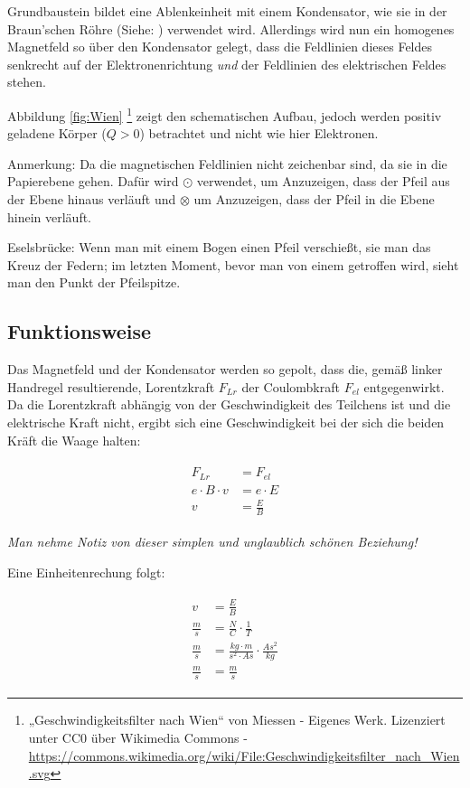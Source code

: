 Grundbaustein bildet eine Ablenkeinheit mit einem Kondensator, wie sie in der Braun'schen Röhre (Siehe: ) verwendet wird. Allerdings wird nun ein homogenes Magnetfeld so über den Kondensator gelegt, dass die Feldlinien dieses Feldes senkrecht auf der Elektronenrichtung \emph{und} der Feldlinien des elektrischen Feldes stehen.

Abbildung \ref{fig:Wien} \footnote{„Geschwindigkeitsfilter nach Wien“ von Miessen - Eigenes Werk. Lizenziert unter CC0 über Wikimedia Commons - \url{https://commons.wikimedia.org/wiki/File:Geschwindigkeitsfilter\_nach\_Wien.svg}} zeigt den schematischen Aufbau, jedoch werden positiv geladene Körper ($Q>0$) betrachtet und nicht wie hier Elektronen.


\begin{leftbar}
	Anmerkung: Da die magnetischen Feldlinien nicht zeichenbar sind, da sie \glqq in die Papierebene\grqq{} gehen. Dafür wird $\odot$ verwendet, um Anzuzeigen, dass der Pfeil aus der Ebene hinaus verläuft und $\otimes$ um Anzuzeigen, dass der Pfeil in die Ebene hinein verläuft.
	
	Eselsbrücke: Wenn man mit einem Bogen einen Pfeil verschießt, sie man das Kreuz der Federn; im letzten Moment, bevor man von einem getroffen wird, sieht man den Punkt der Pfeilspitze.
\end{leftbar}



\subsection{Funktionsweise}

Das Magnetfeld und der Kondensator werden so gepolt, dass die, gemäß linker Handregel resultierende, Lorentzkraft $F_{Lr}$ der Coulombkraft $F_{el}$ entgegenwirkt. Da die Lorentzkraft abhängig von der Geschwindigkeit des Teilchens ist und die elektrische Kraft nicht, ergibt sich eine Geschwindigkeit bei der sich die beiden Kräft die Waage halten:

\begin{align}
\begin{split}
	F_{Lr} &= F_{el} \\
	e \cdot B \cdot v &= e \cdot E \\
	v &= \frac{E}{B}
\end{split}
\end{align}

\noindent \emph{Man nehme Notiz von dieser simplen und unglaublich schönen Beziehung!}

Eine Einheitenrechung folgt:

\begin{align}
\begin{split}
	v &= \frac{E}{B} \\
	\frac{m}{s} &= \frac{N}{C} \cdot \frac{1}{T} \\
	\frac{m}{s} &= \frac{kg \cdot m}{s^2 \cdot As} \cdot \frac{As^2}{kg} \\
	\frac{m}{s} &= \frac{m}{s}
\end{split}
\end{align}


















